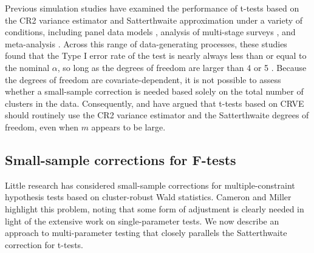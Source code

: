 \documentclass[12pt]{article}\usepackage[]{graphicx}\usepackage[]{color}
\newcommand{\bs}{\boldsymbol}
\begin{document}
Previous simulation studies have examined the performance of t-tests based on the CR2 variance estimator and Satterthwaite approximation under a variety of conditions, including panel data models \citep{Cameron2015practitioners, Imbens2015robust}, analysis of multi-stage surveys \citep{Bell2002bias}, and meta-analysis . Across this range of data-generating processes, these studies found that the Type I error rate of the test is nearly always less than or equal to the nominal $\alpha$, so long as the degrees of freedom are larger than 4 or 5 \citep[][]{Bell2002bias}.
Because the degrees of freedom are covariate-dependent, it is not possible to assess whether a small-sample correction is needed based solely on the total number of clusters in the data. 
Consequently,  and \citet{Imbens2015robust} have argued that t-tests based on CRVE should routinely use the CR2 variance estimator and the Satterthwaite degrees of freedom, even when $m$ appears to be large.

\subsection{Small-sample corrections for F-tests}
\label{subsec:F-tests}

Little research has considered small-sample corrections for multiple-constraint hypothesis tests based on cluster-robust Wald statistics.
Cameron and Miller highlight this problem, noting that some form of adjustment is clearly needed in light of the extensive work on single-parameter tests.
We now describe an approach to multi-parameter testing that closely parallels the Satterthwaite correction for t-tests.
\end{document}
